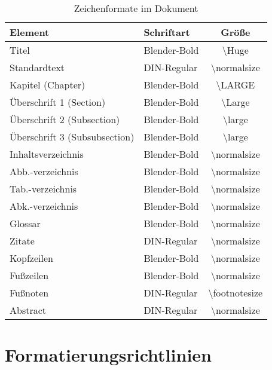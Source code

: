 \begin{table}[h]
	\centering
	\caption{Zeichenformate im Dokument}
	\label{tab:zeichenformate}
	\begin{tabular}{|l|l|c|}
		\hline
		\textbf{Element}              & \textbf{Schriftart} & \textbf{Größe}              \\
		\hline
		Titel                         & Blender-Bold        & \textbackslash Huge         \\
		Standardtext                  & DIN-Regular         & \textbackslash normalsize   \\
		Kapitel (Chapter)             & Blender-Bold        & \textbackslash LARGE        \\
		Überschrift 1 (Section)       & Blender-Bold        & \textbackslash Large        \\
		Überschrift 2 (Subsection)    & Blender-Bold        & \textbackslash large        \\
		Überschrift 3 (Subsubsection) & Blender-Bold        & \textbackslash large        \\
		\hline
		Inhaltsverzeichnis            & Blender-Bold        & \textbackslash normalsize   \\
		Abb.-verzeichnis              & Blender-Bold        & \textbackslash normalsize   \\
		Tab.-verzeichnis              & Blender-Bold        & \textbackslash normalsize   \\
		Abk.-verzeichnis              & Blender-Bold        & \textbackslash normalsize   \\
		Glossar                       & Blender-Bold        & \textbackslash normalsize   \\
		\hline
		Zitate                        & DIN-Regular         & \textbackslash normalsize   \\
		Kopfzeilen                    & Blender-Bold        & \textbackslash normalsize   \\
		Fußzeilen                     & Blender-Bold        & \textbackslash normalsize   \\
		Fußnoten                      & DIN-Regular         & \textbackslash footnotesize \\
		Abstract                      & DIN-Regular         & \textbackslash normalsize   \\
		\hline
	\end{tabular}
\end{table}

\section{Formatierungsrichtlinien}
\label{sec:formatierungsrichtlinien}

